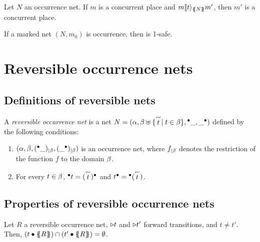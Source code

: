 \begin{lemma}\label{lem:firing_sequence_preserves_concurrent}
  \leanok
  Let $N$ an occurrence net. If $m$ is a concurrent place and $m\llbracket t\rangle_{\{\!\!\{ N \}\!\!\}}m'$, then $m'$ is a concurrent place.
\end{lemma}

\begin{theorem}\label{thm:occ_net_safe}
  \leanok
  If a marked net $(N,m_0)$ is occurrence, then is 1-safe.

\end{theorem}

\chapter{Reversible occurrence nets}\label{chap:reversible}

\section{Definitions of reversible nets}

\begin{definition}\label{def:rev-net}
  A \emph{reversible occurrence net} is a net
  \(
    N=(\places, \transitions \uplus \{\leadstoop{t}\mid t\in\transitions\},
    \preS{\_},\postS{\_})
  \)
  defined by the following conditions:
  \begin{enumerate}
  \item    $(\alpha,\beta, ({}^\bullet{\_})_{|\beta},
    (\_^\bullet)_{|\beta})$ is an occurrence net, where
    $f_{|\beta}$ denotes the restriction of the function $f$ to the
    domain $\beta$.
  \item For every $t \in \beta$, $\preS t = \postS{(\leadstoop{t})}$
    and $\postS{t} = \preS{(\leadstoop{t})}$.
  \end{enumerate}
\end{definition}

\section{Properties of reversible occurrence nets}

\begin{lemma}\label{lem:forward_disjoint_postset}
  \leanok
  Let $R$ a reversible occurrence net, $\triangleright{t}$ and $\triangleright{t'}$ forward transitions, and $t \neq t'$. Then,
    $(t \llbBra R\rrBra) \cap (t'\llbBra R\rrBra) = \emptyset$.
\end{lemma}

